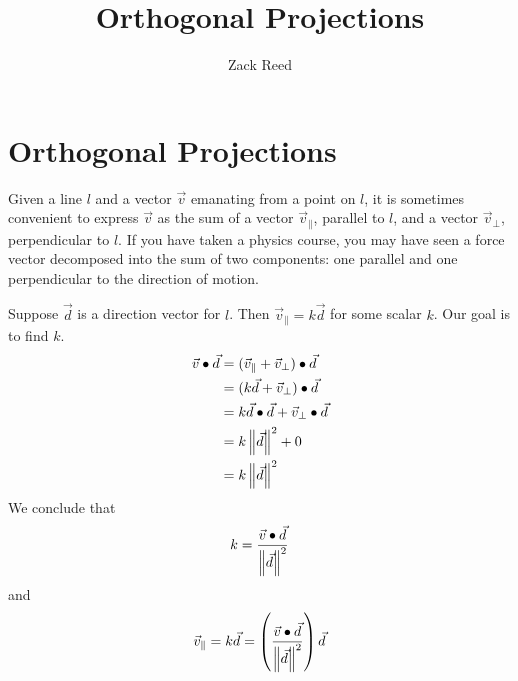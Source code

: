 \documentclass{ximera}
\author{Zack Reed}
\title{Orthogonal Projections}
\begin{document}
\begin{abstract}


\end{abstract}
\maketitle


    \section*{Orthogonal Projections}

     
    Given a line $l$ and a vector $\vec{v}$ emanating from a point on $l$, it is sometimes convenient to express $\vec{v}$ as the sum of a vector $\vec{v}_{\parallel}$, parallel to $l$, and a vector $\vec{v}_{\perp}$, perpendicular to $l$.  If you have taken a physics course, you may have seen a force vector decomposed into the sum of two components: one parallel and one perpendicular to the direction of motion.
     
    \begin{center}
     
    \end{center}
     
    Suppose $\vec{d}$ is a direction vector for $l$.  Then $\vec{v}_
    {\parallel}=k\vec{d}$ for some scalar $k$.  Our goal is to find $k$. 
    \begin{align*}\vec{v}\bullet\vec{d}&=(\vec{v}_{\parallel}+\vec{v}_{\perp})\bullet\vec{d}\\
    &=(k\vec{d}+\vec{v}_{\perp})\bullet\vec{d}\\
    &=k\vec{d}\bullet\vec{d}+\vec{v}_{\perp}\bullet\vec{d}\\
    &=k\left\|\vec{d}\right\|^2+0\\
    &=k\left\|\vec{d}\right\|^2
    \end{align*}
    We conclude that $$k=\frac{\vec{v}\bullet\vec{d}}{\left\|\vec{d}\right\|^2}$$
    and $$\vec{v}_{\parallel}=k\vec{d}=\left(\frac{\vec{v}\bullet\vec{d}}{\left\|\vec{d}\right\|^2}\right)\vec{d}$$
     
\end{document}
